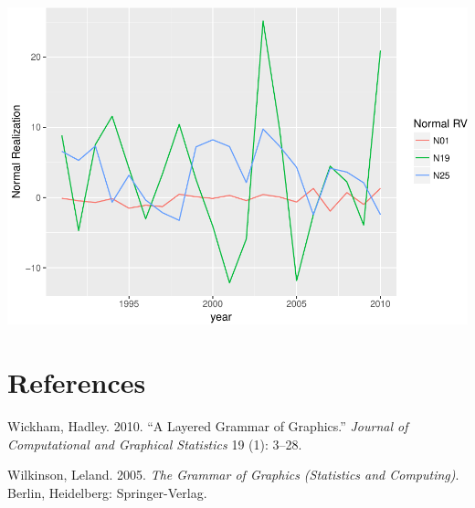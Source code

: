 \documentclass[]{article}
\begin{document}
\includegraphics{Intro_graphics_files/figure-latex/wide_vs_long-2.pdf}

\section*{References}\label{references}

\hypertarget{refs}{}
\hypertarget{ref-Wickham:2010}{}
Wickham, Hadley. 2010. ``A Layered Grammar of Graphics.'' \emph{Journal
of Computational and Graphical Statistics} 19 (1): 3--28.

\hypertarget{ref-Wilkinson:2005}{}
Wilkinson, Leland. 2005. \emph{The Grammar of Graphics (Statistics and
Computing)}. Berlin, Heidelberg: Springer-Verlag.
\end{document}
